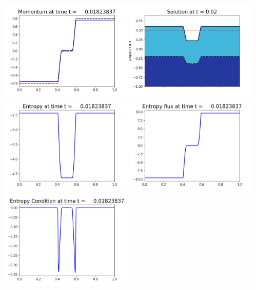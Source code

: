 \documentclass[11pt]{article}
\begin{document}
\vskip 10pt 
\includegraphics[width=0.475\textwidth]{frame0051fig1003.png}
\includegraphics[width=0.475\textwidth]{frame0051fig1006.png}
\vskip 10pt 
\includegraphics[width=0.475\textwidth]{frame0051fig1007.png}
\includegraphics[width=0.475\textwidth]{frame0051fig1008.png}
\vskip 10pt 
\includegraphics[width=0.475\textwidth]{frame0051fig1009.png}
\end{document}
